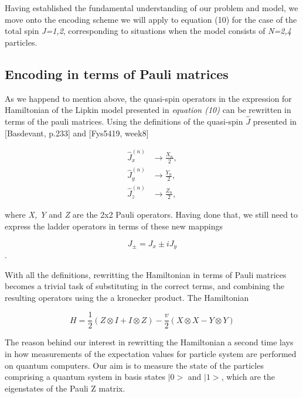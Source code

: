 \documentclass[onecolumn,10pt,cleanfoot]{asme2ej}
\begin{document}
Having established the fundamental understanding of our problem and model, we move onto the encoding scheme we will apply to equation (10) for the case of the total spin \textit{J=1,2}, corresponding to situations when the model consists of \textit{N=2,4} particles.

\subsection{Encoding in terms of Pauli matrices}
As we happend to mention above, the quasi-spin operators in the expression for Hamiltonian of the Lipkin model presented in \textit{equation (10)} can be rewritten in terms of the pauli matrices. Using the definitions of the quasi-spin $\hat{J}$ presented in [Basdevant, p.233] and [Fys5419, week8] 

\begin{equation}
\begin{aligned}
	\hat{J}_x^{(n)} &\rightarrow \frac{X_n}{2}, \\
	\hat{J}_y^{(n)} &\rightarrow \frac{Y_n}{2}, \\
	\hat{J}_z^{(n)} &\rightarrow \frac{Z_n}{2}, 
\end{aligned}
\end{equation}

where \textit{X, Y} and \textit{Z} are the 2x2 Pauli operators. Having done that, we still need to express the ladder operators in terms of these new mappings

\begin{equation}
J_{\pm} = J_x \pm iJ_y
\end{equation}. 

With all the definitions, rewritting the Hamiltonian in terms of Pauli matrices becomes a trivial task of substituting in the correct terms, and combining the resulting operators using the a kronecker product. The Hamiltonian 

\begin{equation}
H = \frac{1}{2} (Z \otimes I + I \otimes Z) - \frac{v}{2} (X \otimes X - Y \otimes Y)
\end{equation}



The reason behind our interest in rewritting the Hamiltonian a second time lays in how measurements of the expectation values for particle system are performed on quantum computers. Our aim is to measure the state of the particles comprising a quantum system in basis states $|0>$ and $|1>$, which are the eigenstates of the Pauli Z matrix. 
\end{document}
